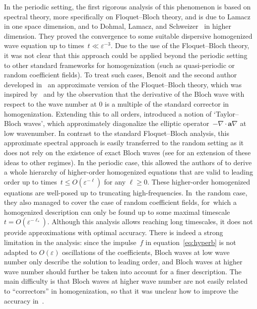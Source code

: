 \documentclass[10pt]{amsart}
\theoremstyle{plain}
\theoremstyle{definition}
\numberwithin{equation}{section}
\newcommand{\e}{\varepsilon}
\newcommand{\Aa}{\boldsymbol a}
\begin{document}
In the periodic setting, the first rigorous analysis of this phenomenon is based on spectral theory, more specifically on Floquet--Bloch theory, and is due to Lamacz~\cite{Lamacz-11} in one space dimension, and to Dohmal, Lamacz, and Schweizer~\cite{DLS-14,DLS-15}
in higher dimension.
They proved the convergence to some suitable dispersive homogenized wave equation up to times~\mbox{$t\ll \e^{-3}$}.
Due to the use of the Floquet--Bloch theory, it was not clear that this approach could be applied beyond the periodic setting to other standard frameworks for homogenization (such as quasi-periodic or random coefficient fields). To treat such cases, Benoit and the second author developed in~\cite{BG} an approximate version of the Floquet--Bloch theory, which was inspired by~\cite{ABV-16} and by the observation that the derivative of the Bloch wave with respect to the wave number at 0 is a multiple of the standard corrector in homogenization. Extending this to all orders, {\cite{BG}} introduced a notion of `Taylor--Bloch waves', which approximately diagonalize the elliptic operator~$-\nabla\cdot\Aa\nabla$ at low wavenumber. In contrast to the standard Floquet--Bloch analysis, this approximate spectral approach is easily {transferred} to the random setting as it does not rely on the existence of exact Bloch waves (see \cite{DGS} for an extension of these ideas to other regimes).
In the periodic case, this allowed {the authors of \cite{BG}} to derive a whole hierarchy of higher-order homogenized equations that are valid to leading order up to times~$t\le O(\e^{-\ell})$ for any $\ell\ge 0$.
These higher-order homogenized equations are well-posed up to truncating high-frequencies.
In~the random case, they also managed to cover the case of random coefficient fields, for~which a homo\-genized description can only be found up to some maximal timescale $t=O(\e^{-\ell_*})$.
Although this analysis allows reaching long timescales, it does not provide approximations with optimal accuracy. There is indeed a strong limitation in the analysis: since the impulse~$f$ in equation~\eqref{eq:hyperb} is not adapted to $O(\e)$ oscillations of the coefficients, Bloch waves at low wave number only describe the solution to leading order, and Bloch waves at higher wave number should further be taken into account for a finer description. The main difficulty is that Bloch waves at higher wave number are not easily related to ``correctors'' in homogenization, so that it was unclear how to improve the accuracy in~\cite{BG}.
\end{document}
